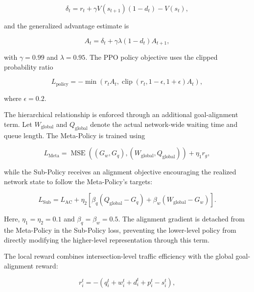 \documentclass[3p,times]{elsarticle}
\theoremstyle{plain}
\theoremstyle{definition}
\begin{document}
\begin{equation}
\delta_t = r_t + \gamma V(s_{t+1})(1 - d_t) - V(s_t),
\end{equation}

and the generalized advantage estimate is

\begin{equation}
A_t = \delta_t + \gamma\lambda(1 - d_t)A_{t+1},
\end{equation}

with $\gamma = 0.99$ and $\lambda = 0.95$. The PPO policy objective
uses the clipped probability ratio

\begin{equation}
L_{\text{policy}} = -\min\left(r_tA_t,
\operatorname{clip}(r_t, 1-\epsilon, 1+\epsilon)A_t\right),
\end{equation}

where $\epsilon = 0.2$.

The hierarchical relationship is enforced through an additional
goal-alignment term. Let $W_{\mathrm{global}}$ and $Q_{\mathrm{global}}$
denote the actual network-wide waiting time and queue length. The
Meta-Policy is trained using

\begin{equation}
L_{\mathrm{Meta}} = \operatorname{MSE}\!\left((G_w, G_q),
(W_{\mathrm{global}}, Q_{\mathrm{global}})\right) + \eta_1 r_g,
\end{equation}

while the Sub-Policy receives an alignment objective encouraging the
realized network state to follow the Meta-Policy's targets:

\begin{equation}
L_{\mathrm{Sub}} = L_{\mathrm{AC}} + \eta_2 \left[
\beta_q(Q_{\mathrm{global}} - G_q) +
\beta_w(W_{\mathrm{global}} - G_w)\right].
\end{equation}

Here, $\eta_1 = \eta_2 = 0.1$ and $\beta_q = \beta_w = 0.5$. The
alignment gradient is detached from the Meta-Policy in the Sub-Policy
loss, preventing the lower-level policy from directly modifying the
higher-level representation through this term.

The local reward combines intersection-level traffic efficiency with
the global goal-alignment reward:

\begin{equation}
r_i^t = -\left(q_i^t + w_i^t + d_i^t + p_i^t - s_i^t\right),
\end{equation}
\end{document}
